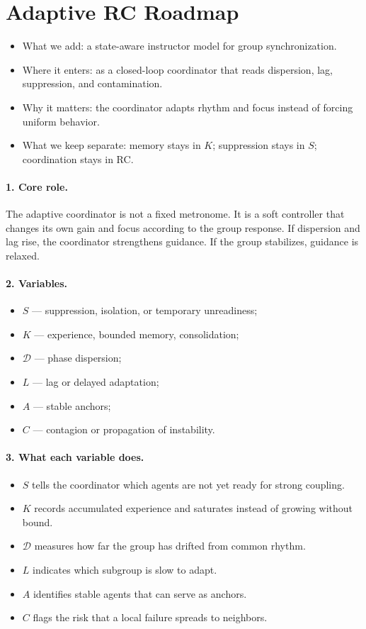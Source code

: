 ﻿\section*{Adaptive RC Roadmap}

\begin{itemize}
    \item What we add: a state-aware instructor model for group synchronization.
    \item Where it enters: as a closed-loop coordinator that reads dispersion, lag, suppression, and contamination.
    \item Why it matters: the coordinator adapts rhythm and focus instead of forcing uniform behavior.
    \item What we keep separate: memory stays in $K$; suppression stays in $S$; coordination stays in RC.
\end{itemize}

\paragraph{1. Core role.}
The adaptive coordinator is not a fixed metronome. It is a soft controller that changes its own gain and focus according to the group response. If dispersion and lag rise, the coordinator strengthens guidance. If the group stabilizes, guidance is relaxed.

\paragraph{2. Variables.}
\begin{itemize}
    \item $S$ --- suppression, isolation, or temporary unreadiness;
    \item $K$ --- experience, bounded memory, consolidation;
    \item $\mathcal{D}$ --- phase dispersion;
    \item $L$ --- lag or delayed adaptation;
    \item $A$ --- stable anchors;
    \item $C$ --- contagion or propagation of instability.
\end{itemize}

\paragraph{3. What each variable does.}
\begin{itemize}
    \item $S$ tells the coordinator which agents are not yet ready for strong coupling.
    \item $K$ records accumulated experience and saturates instead of growing without bound.
    \item $\mathcal{D}$ measures how far the group has drifted from common rhythm.
    \item $L$ indicates which subgroup is slow to adapt.
    \item $A$ identifies stable agents that can serve as anchors.
    \item $C$ flags the risk that a local failure spreads to neighbors.
\end{itemize}

